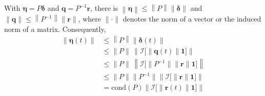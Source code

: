 \documentclass[]{uai2023}
\newcommand{\vect}[1]{\mathbf{#1}}
\newcommand{\Err}{\eta}
\newcommand{\I}{\mathcal{I}}
\begin{document}
    With $\pmb{\Err} = P \pmb{\delta}$ and $\vect{q} = P^{-1}\vect{r}$, there is $\left\|\pmb{\Err}\right\| \leq \left\|P\right\| \|\pmb{\delta}\|$ and $\|\vect{q}\| \leq \left\|P^{-1}\right\| \|\vect{r}\|$, where $\|\cdot\|$ denotes the norm of a vector or the induced norm of a matrix. Consequently,
    \begin{align}
        \left\|\pmb{\Err}(t)\right\| &\leq \left\|P\right\| \|\pmb{\delta}(t)\| \\
        &\leq \|P\|\, \left\|\pmb{\I}\Big[\|\vect{q}(t)\|\vect{1}\Big]\right\|\\
        &\leq \|P\|\, \left\|\pmb{\I}\Big[\|P^{-1}\| \|\vect{r}\|\vect{1}\Big]\right\|\\
        &\leq \|P\|\|P^{-1}\| \left\|\pmb{\I}\Big[\|\vect{r}\|\vect{1}\Big]\right\|\\
        &=\mathrm{cond}(P)\left\|\pmb{\I}\Big[\|\vect{r}(t)\|\vect{1}\Big]\right\| 
    \end{align}

\end{document}
